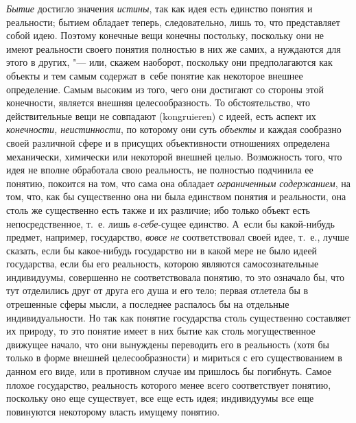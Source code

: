 {\em Бытие} достигло
значения {\em истины},
так как идея есть единство понятия и реальности; бытием
обладает теперь, следовательно, лишь то, что представляет собой идею.
Поэтому конечные вещи конечны постольку, поскольку они не имеют реальности
своего понятия полностью в них же самих, а нуждаются для этого в других, "---
или, скажем наоборот, поскольку они предполагаются как
объекты и тем самым содержат в~себе понятие как некоторое внешнее
определение. Самым высоким из того, чего они достигают со стороны этой
конечности, является внешняя целесообразность. То обстоятельство, что
действительные вещи не совпадают (kongruieren) с идеей, есть
аспект их {\em конечности,
неистинности}, по которому они суть
{\em объекты} и каждая
сообразно своей различной сфере и в присущих объективности отношениях
определена механически, химически или некоторой внешней целью. Возможность
того, что идея не вполне обработала свою реальность, не полностью подчинила
ее понятию, покоится на том, что сама она обладает
{\em ограниченным содержанием},
на том, что, как бы существенно она ни была единством понятия
и реальности, она столь же существенно есть также и их различие; ибо
только объект есть непосредственное, т.~е. лишь
{\em в-себе}-сущее
единство. А~если бы какой-нибудь предмет, например, государство,
{\em вовсе не}
соответствовал своей идее, т.~е., лучше сказать, если бы
какое-нибудь государство ни в какой мере не было идеей государства, если бы
его реальность, которою являются самосознательные индивидуумы, совершенно
не соответствовала понятию, то это означало бы, что тут отделились друг от
друга его душа и его тело; первая отлетела бы в отрешенные сферы мысли, а
последнее распалось бы на отдельные индивидуальности. Но так как понятие
государства столь существенно составляет их природу, то это понятие имеет в
них бытие как столь могущественное движущее начало, что они вынуждены
переводить его в реальность (хотя бы только в форме внешней
целесообразности) и мириться с его существованием в данном его виде, или в
противном случае им пришлось бы погибнуть. Самое плохое государство,
реальность которого менее всего соответствует понятию, поскольку оно еще
существует, все еще есть идея; индивидуумы все еще повинуются некоторому
власть имущему понятию.

